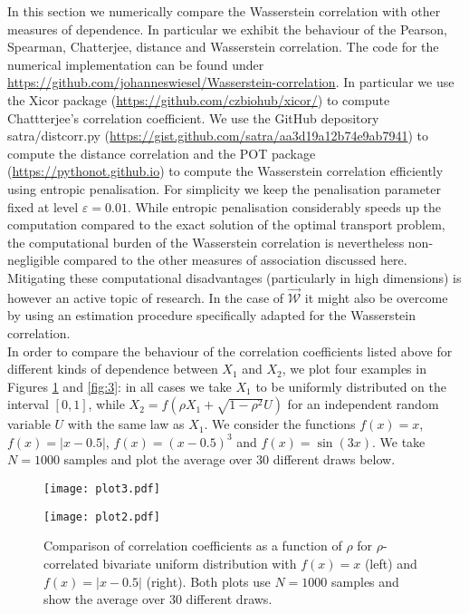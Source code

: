 \documentclass[10pt]{amsart}
\renewcommand{\epsilon}{\varepsilon}
\begin{document}
In this section we numerically compare the Wasserstein correlation with other measures of dependence. In particular we exhibit the behaviour of the Pearson, Spearman, Chatterjee, distance and Wasserstein correlation. The code for the numerical implementation can be found under \href{https://github.com/johanneswiesel/Wasserstein-correlation}{https://github.com/johanneswiesel/Wasserstein-correlation}. In particular we use the Xicor package (\href{https://github.com/czbiohub/xicor/}{https://github.com/czbiohub/xicor/}) to compute Chattterjee's correlation coefficient. We use the GitHub depository satra/distcorr.py (\href{https://gist.github.com/satra/aa3d19a12b74e9ab7941}{https://gist.github.com/satra/aa3d19a12b74e9ab7941}) to compute the distance correlation and the POT package (\href{https://pythonot.github.io}{https://pythonot.github.io}) to compute the Wasserstein correlation efficiently using entropic penalisation. For simplicity we keep the penalisation parameter fixed at level $\epsilon=0.01$. While entropic penalisation considerably speeds up the computation compared to the exact solution of the optimal transport problem, the computational burden of the Wasserstein correlation is nevertheless non-negligible compared to the other measures of association discussed here. Mitigating these computational disadvantages (particularly in high dimensions) is however an active topic of research. In the case of $\overrightarrow{\mathcal{W}}$ it might also be overcome by using an estimation procedure specifically adapted for the Wasserstein correlation. \\
 
In order to compare the behaviour of the correlation coefficients listed above for different kinds of dependence between $X_1$ and $X_2$, we plot four examples in Figures \ref{fig:2} and \ref{fig:3}: in all cases we take $X_1$ to be uniformly distributed on the interval $[0,1]$, while $X_2= f(\rho X_1+\sqrt{1-\rho^2} U)$ for an independent random variable $U$ with the same law as $X_1$. We consider the functions $f(x)=x$, $f(x)=|x-0.5|$, $f(x)=(x-0.5)^3$ and $f(x)=\sin(3x)$. We take $N=1000$ samples and plot the average over $30$ different draws below.

\begin{figure}[h!]
\begin{center}
\begin{minipage}{0.48\textwidth}
\texttt{[image: plot3.pdf]}
\end{minipage}
\quad
\begin{minipage}{0.48\textwidth}
\texttt{[image: plot2.pdf]}
\end{minipage}
\caption{Comparison of correlation coefficients as a function of $\rho$ for $\rho$-correlated bivariate uniform distribution with $f(x)=x$ (left) and $f(x)=|x-0.5|$ (right). Both plots use $N=1000$ samples and show the average over $30$ different draws.}\label{fig:2}
\end{center}
\end{figure}
\end{document}
